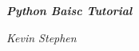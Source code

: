 \pagestyle{empty}

\vspace*{8cm}
\begin{center}
    \Huge\textit{\textbf{Python Baisc Tutorial}}
\end{center}

\vspace*{8cm}
\begin{center}
    \textit{Kevin Stephen}
\end{center}
